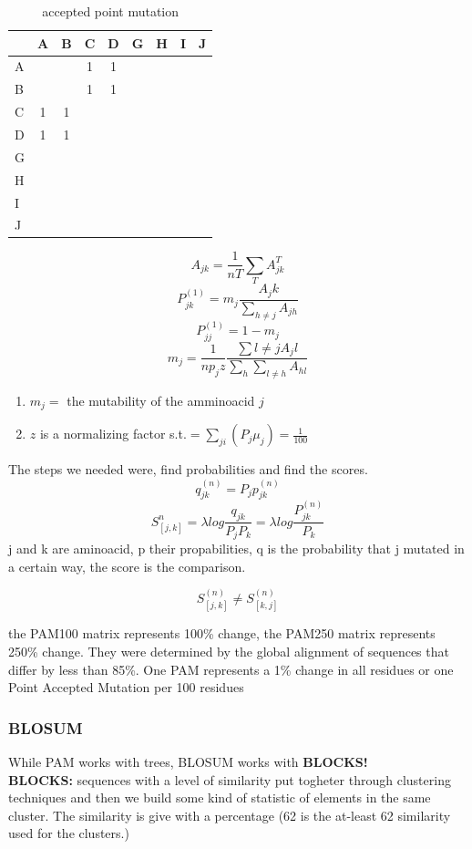 \documentclass[11pt]{article}
\begin{document}
\begin{table}[tb]
	\caption{accepted point mutation}
	\label{tab:tablename}
	\centering

	\begin{tabular}{l|cccccccc}
	\hline

	\hline
		 & A & B & C & D & G & H & I & J \\
	\hline
		A&   &   & 1 & 1 & & & & \\
		B&   &   & 1 & 1 & & & & \\
		C& 1 & 1 &  & & & & & \\
		D& 1 & 1 &  & & & & & \\
		G&  &  &  & & & & & \\
		H&  &  &  & & & & & \\
		I&  &  &  & & & & & \\
		J&  &  &  & & & & & \\
	\hline

	\hline
	\end{tabular}
\end{table}

\[
	A_{jk} = \frac{1} {nT} \sum_{T} A_{jk}^{T}
\]
\[
	P_{jk}^{(1)} = m_j \frac{A_jk}{\sum_{h \neq j} A_{jh}}
\]
\[
	P_{jj}^{(1)} = 1 -m_j 
\]
\[
	m_j = \frac{1}{n p_j z} \frac{\sum {l \neq j }A_j l}{\sum_h \sum_{l \neq h} A_{hl} }
\]

\begin{enumerate}
	\item $m_j = $ the mutability of the amminoacid $j$ 
	\item $z$ is a normalizing factor s.t.$ = \sum_{ji}(P_j \mu_j) = \frac{1}{100}$
\end{enumerate}

The steps we needed were, find probabilities and find the scores.
\[
	q_{jk}^{(n)} = P_j p_{jk}^{(n)}
\]
\[
	S_{[j,k]}^n = \lambda log \frac{q_{jk}} {P_j P_k} = \lambda log \frac{P_{jk}^{(n)}}{P_k}
\]
j and k are aminoacid, p their propabilities,
q is the probability that j mutated in a certain way, the score is the comparison.

\[
	S_{[j,k]}^{(n)} \neq S_{[k,j]} ^{(n)}
\]

the PAM100 matrix represents 100\% change, the PAM250 matrix represents 250\% change.
They were determined by the global alignment of sequences that differ by less than 85\%. One PAM represents a 1\% change in all residues or one Point Accepted Mutation per 100 residues


\subsubsection{BLOSUM} %
\label{ssub:blosum}
While PAM works with trees, BLOSUM works with \textbf{BLOCKS!}\\
\textbf{BLOCKS:} sequences with a level of similarity put togheter through clustering techniques and then we build some kind of statistic of elements in the same cluster.
The similarity is give with a percentage (62 is the at-least 62 similarity used for the clusters.)
\end{document}
